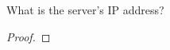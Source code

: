 \documentclass[../../main.tex]{subfiles}
\begin{document}
\begin{wts}
What is the server’s IP address?
\end{wts}
\begin{proof}

\end{proof}
\end{document}
